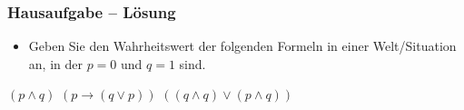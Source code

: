 
\begin{frame}
	\frametitle{Hausaufgabe -- Lösung}
	
	\begin{itemize}
		\item Geben Sie den Wahrheitswert der folgenden Formeln in einer Welt/Situation an, in der $p=0$ und $q=1$ sind.
	\end{itemize}
	
	\begin{exe}
		 $(p \land q)$ \pause  {}
		 $(p \rightarrow (q \lor p))$ \pause {}
		 $((q \land q) \lor (p \land q))$ \pause {}
	\end{exe}
\end{frame}

